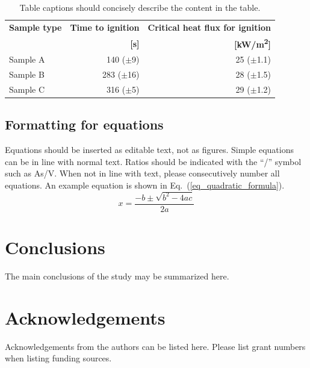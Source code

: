 \documentclass[fleqn,letterpaper,12pt]{article}
\begin{document}
\begin{table}[h!]
\begin{minipage}{.9\textwidth}
\renewcommand*\footnoterule{}
\renewcommand{\thefootnote}{\alph{footnote}}
\renewcommand*{\arraystretch}{1.4}
\caption{Table captions should concisely describe the content in the table.}
\small
\begin{tabular}{|l|r|r|}
\hline
{\bf Sample type}  & {\bf Time to ignition}  & {\bf Critical heat flux for ignition} \\
                   & {\bf[s]}            & {\bf [\si{kW/m^2}]} \\ \hline   
Sample A           & 140 ($\pm$9)   &  25 ($\pm$1.1)  \\ \hline
Sample B           & 283 ($\pm$16)  &  28 ($\pm$1.5)  \\ \hline
Sample C           & 316 ($\pm$5)   &  29 ($\pm$1.2)  \\ \hline
\end{tabular}
\label{example_table}
\end{minipage}
\end{table}

\subsection{Formatting for equations}

Equations should be inserted as editable text, not as figures.  Simple equations can be in line with normal text.  Ratios should be indicated with the “/” symbol such as As/V.  When not in line with text, please consecutively number all equations.  An example equation is shown in Eq.~(\ref{eq_quadratic_formula}).
\begin{equation}
\label{eq_quadratic_formula}
x = \frac{-b \pm \sqrt{b^2-4ac}}{2a}
\end{equation}

\section{Conclusions}

The main conclusions of the study may be summarized here.

\section*{Acknowledgements}

Acknowledgements from the authors can be listed here.  Please list grant numbers when listing funding sources.



\end{document}
